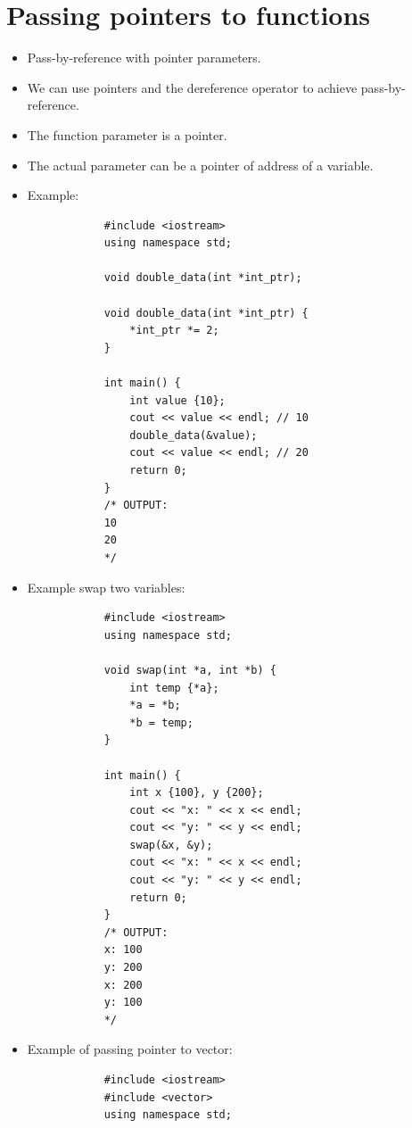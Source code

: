 \section{Passing pointers to functions}
\begin{itemize}
    \item Pass-by-reference with pointer parameters.
    \item We can use pointers and the dereference operator to achieve pass-by-reference.
    \item The function parameter is a pointer.
    \item The actual parameter can be a pointer of address of a variable.
    \item Example:
        \begin{verbatim}
            #include <iostream>
            using namespace std;

            void double_data(int *int_ptr);

            void double_data(int *int_ptr) {
                *int_ptr *= 2;
            }

            int main() {
                int value {10};
                cout << value << endl; // 10
                double_data(&value);
                cout << value << endl; // 20
                return 0;
            }
            /* OUTPUT:
            10
            20
            */
        \end{verbatim}
    
    \item Example swap two variables:
        \begin{verbatim}
            #include <iostream>
            using namespace std;

            void swap(int *a, int *b) {
                int temp {*a};
                *a = *b;
                *b = temp;
            }

            int main() {
                int x {100}, y {200};
                cout << "x: " << x << endl;
                cout << "y: " << y << endl;
                swap(&x, &y);
                cout << "x: " << x << endl;
                cout << "y: " << y << endl;
                return 0;
            }
            /* OUTPUT:
            x: 100
            y: 200
            x: 200
            y: 100
            */
        \end{verbatim}
    
    \item Example of passing pointer to vector:
        \begin{verbatim}
            #include <iostream>
            #include <vector>
            using namespace std;


\end{verbatim}
\end{itemize}
